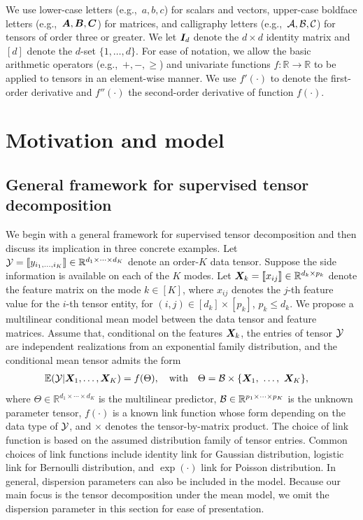 \documentclass[12pt]{article}
\theoremstyle{definition}
\theoremstyle{definition}
\begin{document}
We use lower-case letters (e.g.,\ $a,b,c$) for scalars and vectors, upper-case boldface letters (e.g.,\ $\bm A, \bm B, \bm C$) for matrices, and calligraphy letters (e.g.,\ $\mathcal{A}, \mathcal{B}, \mathcal{C}$) for tensors of order three or greater. We let $\bm I_d$ denote the $d \times d$ identity matrix and $[d]$ denote the $d$-set $\{1,\ldots,d\}$. For ease of notation, we allow the basic arithmetic operators (e.g.,\ $+, -, \geq $) and univariate functions $f\colon \mathbb{R}\to \mathbb{R}$ to be applied to tensors in an element-wise manner. We use $f'(\cdot)$ to denote the first-order derivative and $f''(\cdot)$ the second-order derivative of function $f(\cdot)$. 

\section{Motivation and model}\label{sec:model}
\subsection{General framework for supervised tensor decomposition}
We begin with a general framework for supervised tensor decomposition and then discuss its implication in three concrete examples. Let $\mathcal{Y}=\llbracket y_{i_1,\ldots,i_K} \rrbracket\in\mathbb{R}^{d_1\times \cdots\times d_K}$ denote an order-$K$ data tensor. Suppose the side information is available on each of the $K$ modes. Let $\bm X_k=\llbracket x_{ij} \rrbracket\in\mathbb{R}^{d_k\times p_k}$ denote the feature matrix on the mode $k\in[K]$, where $x_{ij}$ denotes the $j$-th feature value for the $i$-th tensor entity, for $(i,j)\in[d_k]\times[p_k]$, $p_k\leq d_k$. We propose a multilinear conditional mean model between the data tensor and feature matrices. Assume that, conditional on the features $\bm X_k$, the entries of tensor $\mathcal{Y}$ are independent realizations from an exponential family distribution, and the conditional mean tensor admits the form
\begin{align}\label{eq:tensormodel}
&\mathbb{E}(\mathcal{Y}|\bm X_1,\ldots,\bm X_K)=f(\Theta),\quad \text{with}\quad \Theta =\mathcal{B}\times\{\bm X_1,\ \ldots,\ \bm X_K\} ,
\end{align}
where $\Theta\in\mathbb{R}^{d_1\times \cdots\times d_K}$ is the multilinear predictor, $\mathcal{B}\in\mathbb{R}^{p_1\times \cdots \times p_K}$ is the unknown parameter tensor, $f(\cdot)$ is a known link function whose form depending on the data type of $\mathcal{Y}$, and $\times$ denotes the tensor-by-matrix product. The choice of link function is based on the assumed distribution family of tensor entries. Common choices of link functions include identity link for Gaussian distribution, logistic link for Bernoulli distribution, and $\exp(\cdot)$ link for Poisson distribution. In general, dispersion parameters can also be included in the model. Because our main focus is the tensor decomposition under the mean model, we omit the dispersion parameter in this section for ease of presentation. 
\end{document}
